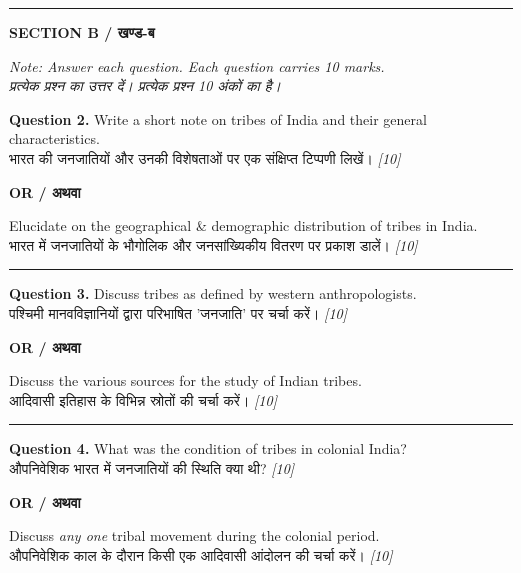\documentclass[11pt,a4paper]{article}
\newcommand{\pts}[1]{\hfill \textit{[#1]}}
\begin{document}
\bigskip
\rule{\linewidth}{0.2pt}
\bigskip

\begin{center}
  {\large\bfseries SECTION B / खण्ड-ब}
\end{center}

\noindent \textit{Note: Answer each question. Each question carries 10 marks.}\\[2pt]
\noindent \textit{प्रत्येक प्रश्न का उत्तर दें। प्रत्येक प्रश्न 10 अंकों का है।}

\bigskip

\noindent \textbf{Question 2.} Write a short note on tribes of India and their general characteristics.\\[1pt]
भारत की जनजातियों और उनकी विशेषताओं पर एक संक्षिप्त टिप्पणी लिखें। \pts{10}

\begin{center}
  \textbf{OR / अथवा}
\end{center}

\noindent Elucidate on the geographical \& demographic distribution of tribes in India.\\[1pt]
भारत में जनजातियों के भौगोलिक और जनसांख्यिकीय वितरण पर प्रकाश डालें। \pts{10}

\medskip\rule{\linewidth}{0.2pt}\medskip

\noindent \textbf{Question 3.} Discuss tribes as defined by western anthropologists.\\[1pt]
पश्चिमी मानवविज्ञानियों द्वारा परिभाषित 'जनजाति' पर चर्चा करें। \pts{10}

\begin{center}
  \textbf{OR / अथवा}
\end{center}

\noindent Discuss the various sources for the study of Indian tribes.\\[1pt]
आदिवासी इतिहास के विभिन्न स्रोतों की चर्चा करें। \pts{10}

\medskip\rule{\linewidth}{0.2pt}\medskip

\noindent \textbf{Question 4.} What was the condition of tribes in colonial India?\\[1pt]
औपनिवेशिक भारत में जनजातियों की स्थिति क्या थी? \pts{10}

\begin{center}
  \textbf{OR / अथवा}
\end{center}

\noindent Discuss \textit{any one} tribal movement during the colonial period.\\[1pt]
औपनिवेशिक काल के दौरान किसी एक आदिवासी आंदोलन की चर्चा करें। \pts{10}
\end{document}
